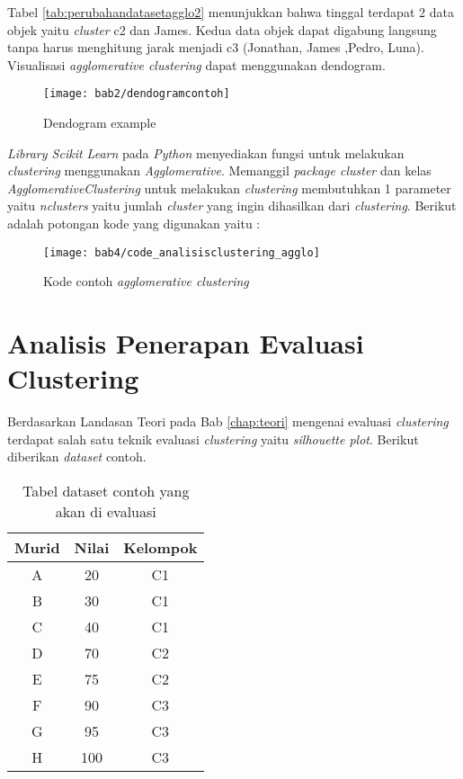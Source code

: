 Tabel \ref{tab:perubahandatasetagglo2} menunjukkan bahwa tinggal terdapat 2 data objek yaitu \textit{cluster}
c2 dan James. Kedua data objek dapat digabung langsung tanpa harus menghitung jarak menjadi c3 (Jonathan, James ,Pedro, Luna). Visualisasi \textit{agglomerative clustering} dapat menggunakan dendogram. 


\begin{figure}[H]
	\centering  
	\texttt{[image: bab2/dendogramcontoh]}   		
	\caption{Dendogram example}
	\label{ref:dendogramcontoh} 
\end{figure} 



\textit{Library Scikit Learn} pada \textit{Python} menyediakan fungsi untuk melakukan \textit{clustering} menggunakan \textit{Agglomerative}. Memanggil \textit{package cluster} dan kelas \textit{AgglomerativeClustering} untuk melakukan \textit{clustering} membutuhkan 1 parameter yaitu \textit{n\textunderscore clusters} yaitu jumlah \textit{cluster} yang ingin dihasilkan dari \textit{clustering}. Berikut adalah potongan kode yang digunakan yaitu : 
%

\begin{figure}[H]
	\centering  
	\texttt{[image: bab4/code\_analisisclustering\_agglo]}   
	\caption{Kode contoh \textit{agglomerative clustering}}
	\label{fig:code_analisisclustering_agglo} 
\end{figure} 

\section{Analisis Penerapan Evaluasi Clustering} 
Berdasarkan Landasan Teori pada Bab \ref{chap:teori} mengenai evaluasi \textit{clustering} terdapat 
salah satu teknik evaluasi \textit{clustering} yaitu \textit{silhouette plot}. Berikut diberikan \textit{dataset} contoh. 

\begin{table}[H]
\centering
\begin{tabular}{|c|c|c|}
\hline 
Murid & Nilai & Kelompok \\ 
\hline 
A & 20 & C1 \\ 
\hline 
B & 30 & C1 \\ 
\hline 
C & 40 & C1 \\ 
\hline 
D & 70 & C2 \\ 
\hline 
E & 75 & C2 \\ 
\hline 
F & 90 & C3 \\ 
\hline 
G & 95 & C3 \\ 
\hline 
H & 100 & C3 \\ 
\hline 
\end{tabular} 
\caption{Tabel dataset contoh yang akan di evaluasi}
\label{tab:datasetevaluasiclustering}
\end{table}


